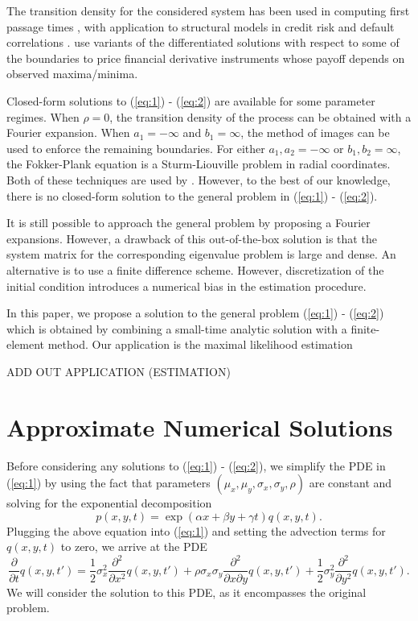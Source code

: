 \documentclass[10pt]{article}
\begin{document}
The transition density for the considered system has been used in
computing first passage times \citep{kou2016first,
  sacerdote2016first}, with application to structural models in credit
risk and default correlations \citep{haworth2008modelling,
  ching2014correlated}. \cite{he1998double} use variants of the
differentiated solutions with respect to some of the boundaries to
price financial derivative instruments whose payoff depends on
observed maxima/minima. 

Closed-form solutions to (\ref{eq:1}) - (\ref{eq:2}) are available for
some parameter regimes. When $\rho = 0$, the transition density of the
process can be obtained with a Fourier expansion. When $a_1 = -\infty$
and $b_1 = \infty$, the method of images can be used to enforce the
remaining boundaries. For either $a_1, a_2 = -\infty$ or
$b_1, b_2 = \infty$, the Fokker-Plank equation is a Sturm-Liouville
problem in radial coordinates. Both of these techniques are used by
\cite{he1998double}. However, to the best of our knowledge, there is
no closed-form solution to the general problem in (\ref{eq:1}) -
(\ref{eq:2}).

It is still possible to approach the general problem by proposing a
Fourier expansions. However, a drawback of this out-of-the-box
solution is that the system matrix for the corresponding eigenvalue
problem is large and dense. An alternative is to use a finite
difference scheme. However, discretization of the initial condition
introduces a numerical bias in the estimation procedure.

In this paper, we propose a solution to the general problem
(\ref{eq:1}) - (\ref{eq:2}) which is obtained by combining a
small-time analytic solution with a finite-element method. Our
application is the maximal likelihood estimation

ADD OUT APPLICATION (ESTIMATION)

\section{Approximate Numerical Solutions}
Before considering any solutions to (\ref{eq:1}) - (\ref{eq:2}), we
simplify the PDE in (\ref{eq:1}) by using the fact that parameters
$(\mu_x, \mu_y, \sigma_x, \sigma_y, \rho)$ are constant and solving
for the exponential decomposition
\[
  p(x,y,t) = \exp(\alpha x + \beta y + \gamma t) q(x,y,t).
\]
Plugging the above equation into (\ref{eq:1}) and setting the
advection terms for $q(x,y,t)$ to zero, we arrive at the PDE
\begin{equation}
  \frac{\partial}{\partial t} q(x,y,t') = \frac{1}{2}\sigma_x^2
  \frac{\partial^2}{\partial x^2}q(x,y,t') + \rho\sigma_x\sigma_y
  \frac{\partial^2}{\partial x \partial y}q(x,y,t') +
  \frac{1}{2}\sigma_y^2 \frac{\partial^2}{\partial y^2}q(x,y,t').
  \label{eq:qq}
\end{equation}
We will consider the solution to this PDE, as it encompasses the
original problem.
\end{document}
